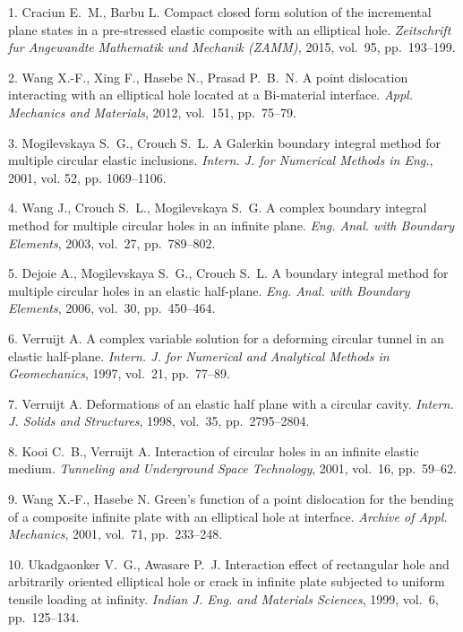 

{\footnotesize

\vskip 3mm


\vskip 2mm

1. Craciun E.~M.,  Barbu L.  Compact closed form solution of the
incremental plane states in a pre-stressed elastic composite with
an elliptical hole. {\it Zeitschrift fur Angewandte Mathematik und
Mechanik (ZAMM),} 2015, vol.~95, pp.~193--199.

2. Wang X.-F., Xing F.,  Hasebe N.,  Prasad P.~B.~N. A point
dislocation interacting with an elliptical hole located at a
Bi-material interface. {\it Appl. Mechanics and Materials}, 2012,
vol.~151, pp.~75--79.

3. Mogilevskaya S.~G., Crouch S.~L. A Galerkin boundary integral
method for multiple circular elastic inclusions. {\it Intern. J.
for Numerical Methods in Eng.}, 2001, vol. 52, pp. 1069--1106.

4. Wang J., Crouch S.~L., Mogilevskaya S.~G. A complex boundary
integral method for multiple circular holes in an infinite plane.
{\it Eng. Anal. with Boundary Elements}, 2003, vol.~27,
pp.~789--802.

5. Dejoie A., Mogilevskaya S.~G., Crouch S.~L. A boundary integral
method for multiple circular holes in an elastic half-plane. {\it
Eng. Anal. with Boundary Elements}, 2006, vol.~30, pp.~450--464.

6. Verruijt A. A complex variable solution for a deforming
circular tunnel in an elastic half-plane. {\it Intern. J. for
Numerical and Analytical Methods in Geomechanics}, 1997, vol.~21,
pp.~77--89.

7. Verruijt A. Deformations of an elastic half plane with a
circular cavity. {\it Intern. J. Solids and Structures}, 1998,
vol.~35, pp.~2795--2804.

8. Kooi C.~B.,   Verruijt A. Interaction of circular holes in an
infinite elastic medium. {\it Tunneling and Underground Space
Technology}, 2001, vol.~16, pp.~59--62.

9. Wang X.-F.,  Hasebe N. Green's function of a point dislocation
for the bending of a composite infinite plate with an elliptical
hole at interface. {\it Archive of Appl. Mechanics}, 2001,
vol.~71, pp.~233--248.

10. Ukadgaonker V.~G.,  Awasare P.~J. Interaction effect of
rectangular hole and arbitrarily oriented elliptical hole or crack
in infinite plate subjected to uniform tensile loading at
infinity. {\it Indian J. Eng. and Materials Sciences}, 1999,
vol.~6, pp.~125--134.

}
